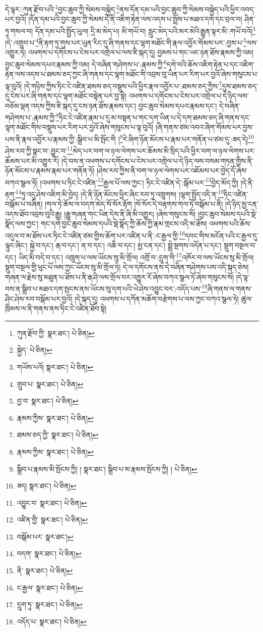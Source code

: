 དེ་ལྟར་:ཀུན་རྫོབ་པའི་\footnote{ཀུན་རྫོབ་ཀྱི་  སྣར་ཐང་།  པེ་ཅིན། }བྱང་ཆུབ་ཀྱི་སེམས་བསྐྱེད་\footnote{སྐྱེད་  པེ་ཅིན། }ནས་དོན་དམ་པའི་བྱང་ཆུབ་ཀྱི་སེམས་བསྐྱེད་པའི་ཕྱིར་འབད་པར་བྱའོ། །དོན་དམ་པའི་བྱང་ཆུབ་ཀྱི་སེམས་དེ་ནི་འཇིག་རྟེན་ལས་འདས་པ་སྤྲོས་པ་མཐའ་དག་དང་བྲལ་བ། ཤིན་ཏུ་གསལ་བ། དོན་དམ་པའི་སྤྱོད་ཡུལ། དྲི་མ་མེད་པ། མི་གཡོ་བ། རླུང་མེད་པའི་མར་མེའི་རྒྱུན་ལྟར་མི་:གཡོ་བའོ།\footnote{གཡོས་པའོ།  སྣར་ཐང་།  པེ་ཅིན། } །དེ་:འགྲུབ་པ་\footnote{གྲུབ་པ་  སྣར་ཐང་།  པེ་ཅིན། }ནི་རྟག་ཏུ་གུས་པར་ཡུན་རིང་དུ་ཞི་གནས་དང་ལྷག་མཐོང་གི་རྣལ་འབྱོར་གོམས་པར་:བྱས་པ་\footnote{བྱ་བ་  སྣར་ཐང་།  པེ་ཅིན། }ལས་འགྱུར་ཏེ། འཕགས་པ་དགོངས་པ་ངེས་པར་འགྲེལ་པ་ལས་ཇི་སྐད་དུ། བྱམས་པ་གང་ཡང་ཉན་ཐོས་རྣམས་ཀྱི་འམ། བྱང་ཆུབ་སེམས་དཔའ་རྣམས་ཀྱི་འམ། དེ་བཞིན་གཤེགས་པ་:རྣམས་ཀྱི་\footnote{རྣམས་ཀྱིས་  སྣར་ཐང་།  པེ་ཅིན། }དགེ་བའི་ཆོས་འཇིག་རྟེན་པ་དང་འཇིག་རྟེན་ལས་འདས་པ་ཐམས་ཅད་ཀྱང་ཞི་གནས་དང་ལྷག་མཐོང་གི་འབྲས་བུ་ཡིན་པར་རིག་པར་བྱའོ་ཞེས་གསུངས་པ་ལྟ་བུའོ། །དེ་གཉིས་ཀྱིས་ཏིང་ངེ་འཛིན་ཐམས་ཅད་བསྡུས་པའི་ཕྱིར་རྣལ་འབྱོར་པ་:ཐམས་ཅད་ཀྱིས་\footnote{ཐམས་ཅད་ཀྱི་  སྣར་ཐང་།  པེ་ཅིན། }དུས་ཐམས་ཅད་དུ་ངེས་པར་ཞི་གནས་དང་ལྷག་མཐོང་བསྟེན་པར་བྱ་སྟེ། འཕགས་པ་དགོངས་པ་ངེས་པར་འགྲེལ་པ་དེ་ཉིད་ལས་བཅོམ་ལྡན་འདས་ཀྱིས་ཇི་སྐད་དུ་ངས་ཉན་ཐོས་རྣམས་དང་། བྱང་ཆུབ་སེམས་དཔའ་རྣམས་དང་། དེ་བཞིན་གཤེགས་པ་:རྣམས་ཀྱི་\footnote{རྣམས་ཀྱིས་  སྣར་ཐང་།  པེ་ཅིན། }ཏིང་ངེ་འཛིན་རྣམ་པ་དུ་མ་བསྟན་པ་གང་དག་ཡིན་པ་དེ་དག་ཐམས་ཅད་ཞི་གནས་དང་ལྷག་མཐོང་གིས་བསྡུས་པར་རིག་པར་བྱའོ་ཞེས་གསུངས་པ་ལྟ་བུའོ། །ཞི་གནས་ཙམ་འབའ་ཞིག་གོམས་པར་བྱས་པས་ནི་རྣལ་འབྱོར་པ་རྣམས་ཀྱི་:སྒྲིབ་པ་མི་སྤོང་གི །\footnote{སྒྲིབ་པ་རྣམས་མི་སྤོངས་ཀྱི། །  སྣར་ཐང་། སྒྲིབ་པ་མ་རྣམས་སྤོངས་ཀྱི། །  པེ་ཅིན། }རེ་ཞིག་ཉོན་མོངས་པ་རྣམ་པར་གནོན་པ་ཙམ་དུ་:ཟད་དེ།\footnote{ཟད།  སྣར་ཐང་།  པེ་ཅིན། } ཤེས་རབ་ཀྱི་སྣང་བ་:བྱུང་བ་\footnote{འབྱུང་བ་  སྣར་ཐང་།  པེ་ཅིན། }མེད་པར་བག་ལ་ཉལ་ལེགས་པར་ཆོམས་མི་སྲིད་པའི་ཕྱིར་བག་ལ་ཉལ་ལེགས་པར་ཆོམས་པར་མི་འགྱུར་རོ། །དེ་བས་ན་འཕགས་པ་དགོངས་པ་ངེས་པར་འགྲེལ་པ་དེ་ཉིད་ལས་བསམ་གཏན་གྱིས་ནི་ཉོན་མོངས་པ་རྣམས་རྣམ་པར་གནོན་ཏོ། །ཤེས་རབ་ཀྱིས་ནི་བག་ལ་ཉལ་ལེགས་པར་འཇོམས་པར་བྱེད་དོ་ཞེས་བཀའ་སྩལ་ཏོ། །འཕགས་པ་ཏིང་ངེ་འཛིན་\footnote{འཛིན་གྱི་  སྣར་ཐང་།  པེ་ཅིན། }རྒྱལ་པོ་ལས་ཀྱང་། ཏིང་ངེ་འཛིན་དེ་:སྒོམ་པར་\footnote{བསྒོམ་པར་  སྣར་ཐང་། }བྱེད་མོད་ཀྱི། །དེ་ནི་རྟག་\footnote{བདག་  སྣར་ཐང་།  པེ་ཅིན། }ཏུ་འདུ་ཤེས་འཇིག་མི་བྱེད། །དེ་ནི་ཉོན་མོངས་ཕྱིར་ཞིང་རབ་ཏུ་འཁྲུགས། །ལྷག་སྤྱོད་འདི་ན་\footnote{ནི་  སྣར་ཐང་།  པེ་ཅིན། }ཏིང་འཛིན་བསྒོམ་པ་བཞིན། །གལ་ཏེ་ཆོས་ལ་བདག་མེད་སོ་སོར་རྟོག །སོ་སོར་དེ་བརྟགས་གལ་ཏེ་བསྒོམ་པ་ནི། །དེ་ཉིད་མྱ་ངན་འདས་ཐོབ་འབྲས་བུའི་རྒྱུ། །རྒྱུ་གཞན་གང་ཡིན་དེས་ནི་ཞི་མི་འགྱུར། །ཞེས་གསུངས་སོ། །བྱང་ཆུབ་སེམས་དཔའི་སྡེ་སྣོད་ལས་ཀྱང་། གང་དག་བྱང་ཆུབ་སེམས་དཔའི་སྡེ་སྣོད་ཀྱི་ཆོས་ཀྱི་རྣམ་གྲངས་འདི་མ་ཐོས། འཕགས་པའི་ཆོས་འདུལ་བ་མ་ཐོས་པར་ཏིང་ངེ་འཛིན་ཙམ་གྱིས་ཆོག་པར་འཛིན་པ་ནི་:ང་རྒྱལ་གྱི་\footnote{ང་རྒྱལ་  སྣར་ཐང་།  པེ་ཅིན། }དབང་གིས་མངོན་པའི་ང་རྒྱལ་དུ་ལྟུང་ཞིང་། སྐྱེ་བ་དང་། རྒ་བ་དང་། ན་བ་དང་། འཆི་བ་དང་། མྱ་ངན་དང་། སྨྲེ་སྔགས་འདོན་པ་དང་། སྡུག་བསྔལ་བ་དང་། ཡིད་མི་བདེ་བ་དང་། འཁྲུག་པ་ལས་ཡོངས་སུ་མི་གྲོལ། འགྲོ་བ་:དྲུག་གི་\footnote{དྲུག་ཏུ་  སྣར་ཐང་།  པེ་ཅིན། }འཁོར་བ་ལས་ཡོངས་སུ་མི་གྲོལ། སྡུག་བསྔལ་གྱི་ཕུང་པོ་ལས་ཀྱང་ཡོངས་སུ་མི་གྲོལ་ཏེ། དེ་ལ་དགོངས་ནས་དེ་བཞིན་གཤེགས་པས་འདི་སྐད་ཅེས། གཞན་ལ་རྗེས་སུ་མཐུན་པ་ཐོས་པ་ནི་རྒ་ཤི་ལས་གྲོལ་བར་འགྱུར་རོ་ཞེས་བཀའ་སྩལ་ཏོ་ཞེས་གསུངས་སོ། །དེ་ལྟ་བས་ན་སྒྲིབ་པ་མཐའ་དག་སྤངས་ནས་ཡོངས་སུ་དག་པའི་ཡེ་ཤེས་འབྱུང་བར་:འདོད་པས་\footnote{འདོད་པ་  སྣར་ཐང་།  པེ་ཅིན། }ཞི་གནས་ལ་གནས་ཤིང་ཤེས་རབ་བསྒོམ་པར་བྱའོ། །དེ་སྐད་དུ། འཕགས་པ་དཀོན་མཆོག་བརྩེགས་པ་ལས་ཀྱང་བཀའ་སྩལ་ཏེ། ཚུལ་ཁྲིམས་ལ་ནི་གནས་ནས་ཏིང་ངེ་འཛིན་ཐོབ་སྟེ། 